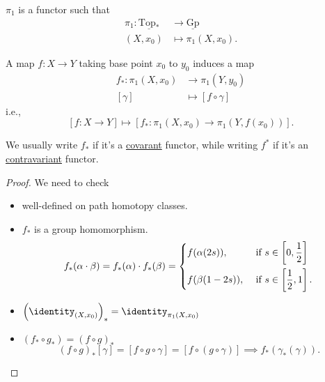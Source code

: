 \begin{theorem}
	\(\pi _1\) is a functor such that
	\[
		\begin{split}
			\pi _1\colon \underline{\mathrm{Top}_*} &\to \underline{\mathrm{Gp}}\\
			(X, x_0)&\mapsto \pi _1(X, x_0).
		\end{split}
	\]

	A map \(f\colon X\to Y\) taking base point \(x_0\) to \(y_0\) induces a map
	\[
		\begin{split}
			f_*\colon \pi _1(X, x_0)&\to \pi _1(Y, y_0)\\
			[\gamma]&\mapsto [f\circ \gamma]
		\end{split}
	\]
	i.e.,
	\[
		\left[f\colon X\to Y\right] \mapsto \left[f_*\colon \pi _1(X, x_0)\to \pi _1(Y, f(x_0))\right].
	\]
\end{theorem}
\begin{notation}
	We usually write \(f_*\) if it's a \hyperref[def:functor]{covarant} functor, while writing \(f^*\)
	if it's an \hyperref[def:contravariant-functor]{contravariant} functor.
\end{notation}
\begin{proof}
	We need to check
	\begin{itemize}
		\item well-defined on path homotopy classes.
		\item \(f_*\) is a group homomorphism.
		      \[
			      f_*(\alpha \cdot \beta ) = f_*(\alpha )\cdot f_*(\beta ) = \begin{dcases}
				      f(\alpha (2s)),  & \text{ if }  s\in \left[0, \frac{1}{2}\right]  \\
				      f(\beta (1-2s)), & \text{ if }  s\in \left[\frac{1}{2}, 1\right].
			      \end{dcases}
		      \]
		\item \(\left(\identity_{(X, x_0)} \right)_* = \identity_{\pi _1(X, x_0)} \)
		\item \((f_*\circ g_*) = (f\circ g)_*\)
		      \[
			      (f\circ g)_*[\gamma] = [f\circ g\circ \gamma] = [f\circ (g\circ \gamma)]\implies f_*(\gamma_*(\gamma)).
		      \]
	\end{itemize}
\end{proof}